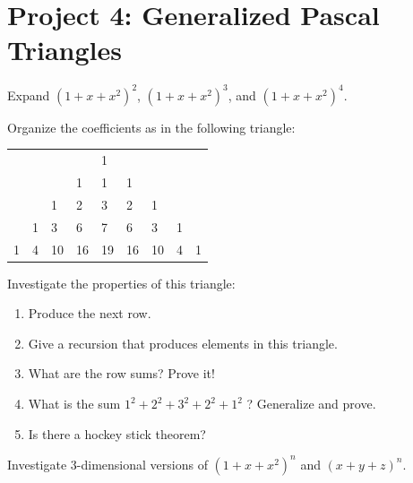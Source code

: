 \documentclass[10pt,]{book}
\theoremstyle{plain}
\theoremstyle{definition}
\theoremstyle{definition}
\theoremstyle{definition}
\theoremstyle{definition}
\numberwithin{equation}{chapter}
\begin{document}
\section[{Project 4: Generalized Pascal Triangles}]{Project 4: Generalized Pascal Triangles}\label{exercises-14}
\begin{divisionexercise}{1}\hypertarget{exercise-148}{}
\hypertarget{p-1312}{}%
Expand \({\left( 1 + x + x^{2} \right)}^{2}\), \(\left( 1 + x + x^{2} \right)^{3}\), and \(\left( 1 + x + x^{2} \right)^{4}\).%
\end{divisionexercise}%
\begin{divisionexercise}{2}\hypertarget{exercise-149}{}
\hypertarget{p-1313}{}%
Organize the coefficients as in the following triangle:%
\begin{sidebyside}{1}{0.1}{0.1}{0}
\begin{sbspanel}{0.8}
{\centering%
\begin{tabular}{lllllllll}
&&&&1&&&&\tabularnewline[0pt]
&&&1&1&1&&&\tabularnewline[0pt]
&&1&2&3&2&1&&\tabularnewline[0pt]
&1&3&6&7&6&3&1&\tabularnewline[0pt]
1&4&10&16&19&16&10&4&1
\end{tabular}
\par}
\end{sbspanel}
\end{sidebyside}
\end{divisionexercise}%
\begin{divisionexercise}{3}\hypertarget{exercise-150}{}
\hypertarget{p-1314}{}%
Investigate the properties of this triangle: \leavevmode%
\begin{enumerate}[label=(\alph*)]
\item\hypertarget{li-260}{}\hypertarget{p-1315}{}%
Produce the next row.%
\item\hypertarget{li-261}{}\hypertarget{p-1316}{}%
Give a recursion that produces elements in this triangle.%
\item\hypertarget{li-262}{}\hypertarget{p-1317}{}%
What are the row sums? Prove it!%
\item\hypertarget{li-263}{}\hypertarget{p-1318}{}%
What is the sum \(1^{2} + 2^{2} + 3^{2} + 2^{2} + 1^{2}\) ? Generalize and prove.%
\item\hypertarget{li-264}{}\hypertarget{p-1319}{}%
Is there a hockey stick theorem?%
\end{enumerate}
%
\end{divisionexercise}%
\begin{divisionexercise}{4}\hypertarget{exercise-151}{}
\hypertarget{p-1320}{}%
Investigate 3-dimensional versions of \(\left( 1 + x + x^{2} \right)^{n}\) and \(\left( x + y + z \right)^{n}.\)%
\end{divisionexercise}%
\end{document}
